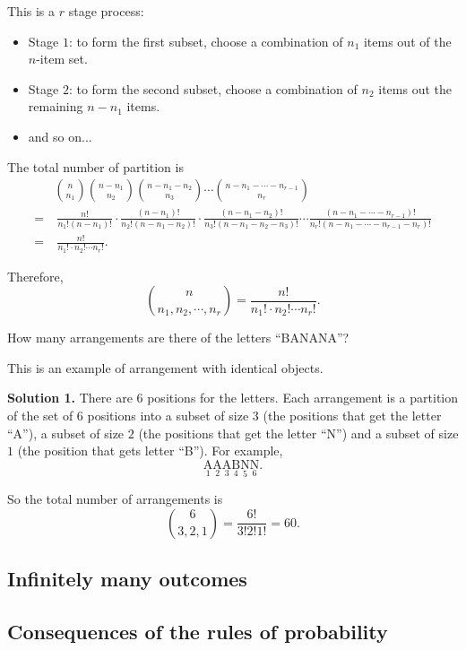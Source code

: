   This is a $r$ stage process:
  \begin{itemize}
  \item Stage $1$: to form the first subset, choose a combination of $n_1$ items
    out of the $n$-item set.
  \item Stage $2$: to form the second subset, choose a combination of $n_2$
    items out the remaining $n-n_1$ items.
  \item and so on...
  \end{itemize}

  The total number of partition is
  \begin{align*}
    &\binom{n}{n_1}\binom{n-n_1}{n_2}\binom{n-n_1-n_2}{n_3}\cdots\binom{n-n_1-\cdots
    - n_{r-1}}{n_r} \\
    =&\ \frac{n!}{n_1!(n-n_1)!}\cdot \frac{(n-n_1)!}{n_2!(n-n_1-n_2)!}\cdot \frac{(n-n_1-n_2)!}{n_3!(n-n_1-n_2-n_3)!}\cdots \frac{(n-n_1-\cdots -n_{r-1})!}{n_r!(n-n_1-\cdots - n_{r-1}-n_r)!}\\
    =&\ \frac{n!}{n_1!\cdot n_2!\cdots n_r!}.
  \end{align*}

  Therefore,
  \[
    \binom{n}{n_1,n_2,\cdots, n_r} = \frac{n!}{n_1!\cdot n_2!\cdots n_r!}.
  \]

  \begin{example}
    How many arrangements are there of the letters ``BANANA''? 
  \end{example}

  This is an example of arrangement with identical objects.

  \textbf{Solution 1.} There are $6$ positions for the letters. Each arrangement
  is a partition of the set of $6$ positions into a subset of size $3$ (the
  positions that get the letter ``A''), a subset of size $2$ (the positions that
  get the letter ``N'') and a subset of size $1$ (the position that gets letter
  ``B''). For example,
  \[
    \underset{1}{\text{A}}\underset{2}{\text{A}}\underset{3}{\text{A}}\underset{4}{\text{B}}
    \underset{5}{\text{N}} \underset{6}{\text{N}}.
  \]
  
  So the total number of arrangements is
  \[
    \binom{6}{3,2,1} = \frac{6!}{3!2!1!} = 60.
  \]

  
  \subsection{Infinitely many outcomes}
  \label{subsec:1.3}

  \subsection{Consequences of the rules of probability}
  \label{subsec:1.4}

